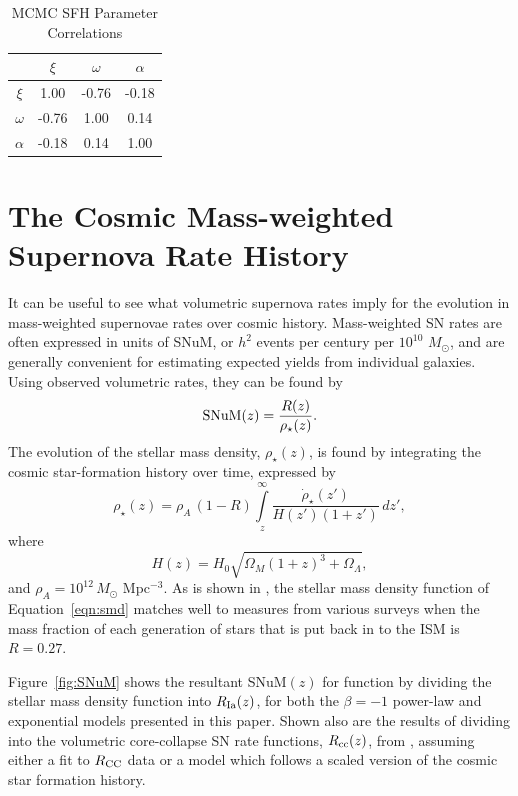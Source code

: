 \documentclass[apj]{aastex62}
\begin{document}
\begin{table}[h]
    \centering
    \caption{MCMC SFH Parameter Correlations}
    \label{tab:parameter_correlations2}
    \begin{tabular}{c|ccc}
         & $\xi$ & $\omega$ & $\alpha$\\ 
        \hline
           $\xi$ &  1.00 & -0.76 & -0.18 \\ 
        $\omega$ & -0.76 &  1.00 &  0.14 \\ 
        $\alpha$ & -0.18 &  0.14 &  1.00 \\ 
        \hline
    \end{tabular}
\end{table}
\clearpage

\section{The Cosmic Mass-weighted Supernova Rate History}\label{sec:snum}
It can be useful to see what volumetric supernova rates imply for the evolution in mass-weighted supernovae rates over cosmic history. Mass-weighted SN rates are often expressed in units of SNuM, or $h^2$ events per century per $10^{10}$ $M_{\odot}$, and are generally convenient for estimating expected yields from individual galaxies. Using observed volumetric rates, they can be found by
\begin{equation}
	{\rm SNuM}(z) = \frac{R(z)}{{\rho}_{\star}(z)}.
\end{equation}
\noindent The evolution of the stellar mass density, ${\rho}_{\star}(z)$, is found by integrating the cosmic star-formation history over time, expressed by
\begin{equation}
	\rho_{\star}(z)=\rho_A\,(1-R) \int\limits_z^{\infty}\frac{\dot{\rho}_{\star}(z')}{H(z')(1+z')}\,dz',
	\label{eqn:smd}
\end{equation}
\noindent where 
\begin{equation}
	H(z) = H_0\sqrt{\Omega_M(1+z)^3+\Omega_{\Lambda}},
\end{equation}
\noindent and $\rho_A=10^{12}\, M_{\odot}$ Mpc$^{-3}$. As is shown in \cite{Madau:2014fk}, the stellar mass density function of Equation~\ref{eqn:smd} matches well to measures from various surveys when the mass fraction of each generation of stars that is put back in to the ISM is $R=0.27$.  

Figure~\ref{fig:SNuM} shows the resultant SNuM$(z)$ for function by dividing the stellar mass density function into $R_{\rm Ia}(z)$, for both the $\beta=-1$ power-law and exponential models presented in this paper. Shown also are the results of dividing into the volumetric core-collapse SN rate functions, $R_{\rm cc}(z)$, from \cite{Strolger:2015aa}, assuming either a fit to $R_{\rm CC}$ data or a model which follows a scaled version of the cosmic star formation history. 
\end{document}
